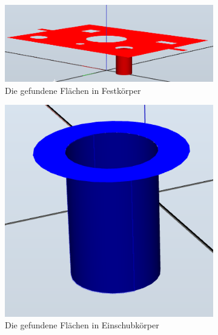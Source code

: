 \documentclass[14pt,a4paper,titlepage]{article}
\begin{document}
			\begin{figure}[h!]
			\centering
			\begin{subfigure}{0.3\linewidth}
				\includegraphics[width=\linewidth]{basefaces4.png}
				\caption{Die gefundene Flächen in Festkörper}
			\end{subfigure}
			\begin{subfigure}{0.3\linewidth}
				\includegraphics[width=\linewidth]{insertfaces4.png}
				\caption{Die gefundene Flächen in Einschubkörper}
			\end{subfigure}	
			\begin{subfigure}{0.3\linewidth}

\end{subfigure}
\end{figure}
\end{document}
